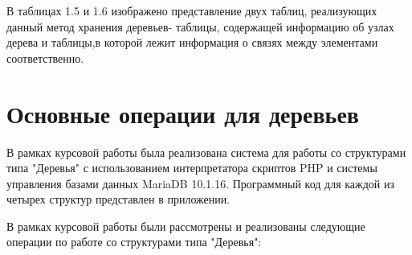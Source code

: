\documentclass[a4paper,14pt]{extreport}
\theoremstyle{definition}
\begin{document}
В таблицах 1.5 и 1.6 изображено представление двух таблиц, реализующих данный метод хранения деревьев- таблицы, содержащей информацию об узлах дерева и таблицы,в которой лежит информация о связях между элементами соответственно.
\begin{table}[H]
\end{table}
\begin{table}[H]
\end{table}
\chapter{Основные операции для деревьев}
В рамках курсовой работы была реализована система для работы со структурами типа "Деревья" с использованием интерпретатора скриптов PHP и системы управления базами данных MariaDB 10.1.16. Программный код для каждой из четырех структур представлен в приложении.

В рамках курсовой работы были рассмотрены и реализованы следующие операции по работе со структурами типа "Деревья":
\end{document}
